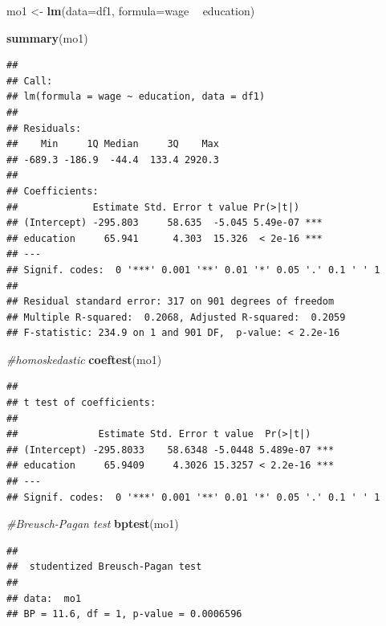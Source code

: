 \documentclass[
]{book}
\newenvironment{Shaded}{\begin{snugshade}}{\end{snugshade}}
\newcommand{\CommentTok}[1]{\textcolor[rgb]{0.56,0.35,0.01}{\textit{#1}}}
\newcommand{\DataTypeTok}[1]{\textcolor[rgb]{0.13,0.29,0.53}{#1}}
\newcommand{\KeywordTok}[1]{\textcolor[rgb]{0.13,0.29,0.53}{\textbf{#1}}}
\newcommand{\NormalTok}[1]{#1}
\newcommand{\OperatorTok}[1]{\textcolor[rgb]{0.81,0.36,0.00}{\textbf{#1}}}
\newcommand{\StringTok}[1]{\textcolor[rgb]{0.31,0.60,0.02}{#1}}
\begin{document}
\begin{Shaded}
\begin{Highlighting}[]
\NormalTok{mo1 <-}\StringTok{ }\KeywordTok{lm}\NormalTok{(}\DataTypeTok{data=}\NormalTok{df1, }\DataTypeTok{formula=}\NormalTok{wage }\OperatorTok{~}\StringTok{ }\NormalTok{education)}

\KeywordTok{summary}\NormalTok{(mo1)}
\end{Highlighting}
\end{Shaded}

\begin{verbatim}
## 
## Call:
## lm(formula = wage ~ education, data = df1)
## 
## Residuals:
##    Min     1Q Median     3Q    Max 
## -689.3 -186.9  -44.4  133.4 2920.3 
## 
## Coefficients:
##             Estimate Std. Error t value Pr(>|t|)    
## (Intercept) -295.803     58.635  -5.045 5.49e-07 ***
## education     65.941      4.303  15.326  < 2e-16 ***
## ---
## Signif. codes:  0 '***' 0.001 '**' 0.01 '*' 0.05 '.' 0.1 ' ' 1
## 
## Residual standard error: 317 on 901 degrees of freedom
## Multiple R-squared:  0.2068, Adjusted R-squared:  0.2059 
## F-statistic: 234.9 on 1 and 901 DF,  p-value: < 2.2e-16
\end{verbatim}

\begin{Shaded}
\begin{Highlighting}[]
\CommentTok{#homoskedastic}
\KeywordTok{coeftest}\NormalTok{(mo1)}
\end{Highlighting}
\end{Shaded}

\begin{verbatim}
## 
## t test of coefficients:
## 
##              Estimate Std. Error t value  Pr(>|t|)    
## (Intercept) -295.8033    58.6348 -5.0448 5.489e-07 ***
## education     65.9409     4.3026 15.3257 < 2.2e-16 ***
## ---
## Signif. codes:  0 '***' 0.001 '**' 0.01 '*' 0.05 '.' 0.1 ' ' 1
\end{verbatim}

\begin{Shaded}
\begin{Highlighting}[]
\CommentTok{#Breusch-Pagan test }
\KeywordTok{bptest}\NormalTok{(mo1)}
\end{Highlighting}
\end{Shaded}

\begin{verbatim}
## 
##  studentized Breusch-Pagan test
## 
## data:  mo1
## BP = 11.6, df = 1, p-value = 0.0006596
\end{verbatim}
\end{document}
